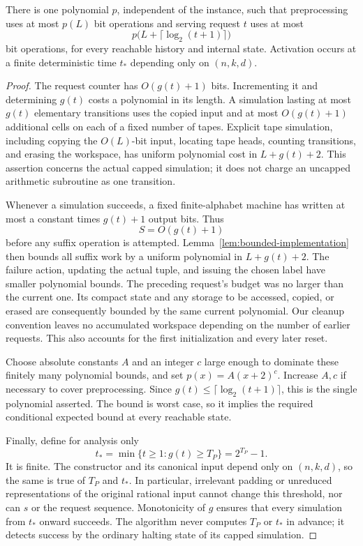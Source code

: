 \begin{proposition}
\label{prop:schedule}
There is one polynomial $p$, independent of the instance, such that
preprocessing uses at most $p(L)$ bit operations and serving request $t$
uses at most
\[
 p\bigl(L+\lceil\log_2(t+1)\rceil\bigr)
\]
bit operations, for every reachable history and internal state.  Activation
occurs at a finite deterministic time $t_*$ depending only on $(n,k,d)$.
\end{proposition}

\begin{proof}
The request counter has $O(g(t)+1)$ bits.  Incrementing it and determining
$g(t)$ costs a polynomial in its length.  A simulation lasting at most
$g(t)$ elementary transitions uses the copied input and at most
$O(g(t)+1)$ additional cells on each of a fixed number of tapes.  Explicit
tape simulation, including copying the $O(L)$-bit input, locating tape
heads, counting transitions, and erasing the workspace, has uniform
polynomial cost in $L+g(t)+2$.  This assertion concerns the actual capped
simulation; it does not charge an uncapped arithmetic subroutine as one
transition.

Whenever a simulation succeeds, a fixed finite-alphabet machine has
written at most a constant times $g(t)+1$ output bits.  Thus
\begin{equation}
 S=O(g(t)+1)
 \label{eq:output-budget}
\end{equation}
before any suffix operation is attempted.  Lemma~\ref{lem:bounded-implementation}
then bounds all suffix work by a uniform polynomial in $L+g(t)+2$.
The failure action, updating the actual tuple, and issuing the chosen
label have smaller polynomial bounds.  The preceding request's budget
was no larger than the current one.  Its compact state and any storage
to be accessed, copied, or erased are consequently bounded by the same
current polynomial.  Our cleanup convention leaves no accumulated
workspace depending on the number of earlier requests.  This also
accounts for the first initialization and every later reset.

Choose absolute constants $A$ and an integer $c$ large enough to dominate
these finitely many polynomial bounds, and set $p(x)=A(x+2)^c$.  Increase
$A,c$ if necessary to cover preprocessing.  Since
$g(t)\le\lceil\log_2(t+1)\rceil$, this is the single polynomial asserted.
The bound is worst case, so it implies the required conditional expected
bound at every reachable state.

Finally, define for analysis only
\begin{equation}
 t_* = \min\{t\ge1:g(t)\ge T_P\}=2^{T_P}-1.
 \label{eq:activation-time}
\end{equation}
It is finite.  The constructor and its canonical input depend only on
$(n,k,d)$, so the same is true of $T_P$ and $t_*$.  In particular,
irrelevant padding or unreduced representations of the original rational
input cannot change this threshold, nor can $s$ or the request sequence.
Monotonicity of $g$ ensures that every simulation from $t_*$ onward
succeeds.  The algorithm never computes $T_P$ or $t_*$ in advance; it
detects success by the ordinary halting state of its capped simulation.
\end{proof}

